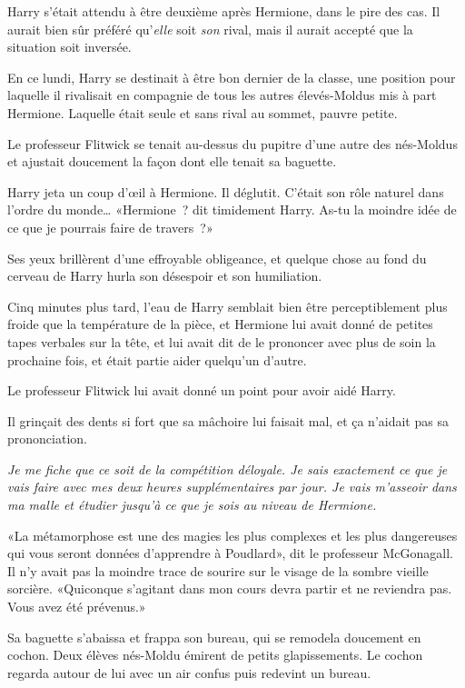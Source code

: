 Harry s'était attendu à être deuxième après Hermione, dans le pire des cas. Il aurait bien sûr préféré qu'\emph{elle} soit \emph{son} rival, mais il aurait accepté que la situation soit inversée.

En ce lundi, Harry se destinait à être bon dernier de la classe, une position pour laquelle il rivalisait en compagnie de tous les autres élevés-Moldus mis à part Hermione. Laquelle était seule et sans rival au sommet, pauvre petite.

Le professeur Flitwick se tenait au-dessus du pupitre d'une autre des nés-Moldus et ajustait doucement la façon dont elle tenait sa baguette.

Harry jeta un coup d'œil à Hermione. Il déglutit. C'était son rôle naturel dans l'ordre du monde… «Hermione~? dit timidement Harry. As-tu la moindre idée de ce que je pourrais faire de travers~?»

Ses yeux brillèrent d'une effroyable obligeance, et quelque chose au fond du cerveau de Harry hurla son désespoir et son humiliation.

Cinq minutes plus tard, l'eau de Harry semblait bien être perceptiblement plus froide que la température de la pièce, et Hermione lui avait donné de petites tapes verbales sur la tête, et lui avait dit de le prononcer avec plus de soin la prochaine fois, et était partie aider quelqu'un d'autre.

Le professeur Flitwick lui avait donné un point pour avoir aidé Harry.

Il grinçait des dents si fort que sa mâchoire lui faisait mal, et ça n'aidait pas sa prononciation.

\emph{Je me fiche que ce soit de la compétition déloyale. Je sais exactement ce que je vais faire avec mes deux heures supplémentaires par jour. Je vais m'asseoir dans ma malle et étudier jusqu'à ce que je sois au niveau de Hermione.}

\later

«La métamorphose est une des magies les plus complexes et les plus dangereuses qui vous seront données d'apprendre à Poudlard», dit le professeur McGonagall. Il n'y avait pas la moindre trace de sourire sur le visage de la sombre vieille sorcière. «Quiconque s'agitant dans mon cours devra partir et ne reviendra pas. Vous avez été prévenus.»

Sa baguette s'abaissa et frappa son bureau, qui se remodela doucement en cochon. Deux élèves nés-Moldu émirent de petits glapissements. Le cochon regarda autour de lui avec un air confus puis redevint un bureau.

